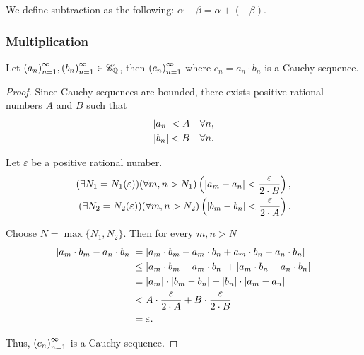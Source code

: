 We define subtraction as the following: $\alpha - \beta = \alpha + (-\beta)$.

\subsubsection*{Multiplication}

\begin{theorem}\label{theorem:chapter1:product-of-cauchy-sequences}
    Let ${\left({a_{n}}\right)}^{\infty}_{n=1}, {\left({b_{n}}\right)}^{\infty}_{n=1}\in\mathscr{C}_{\mathbb{Q}}$, then ${\left({c_{n}}\right)}^{\infty}_{n=1}$ where $c_{n} = a_{n} \cdot b_{n}$ is a Cauchy sequence.
\end{theorem}

\begin{proof}
    Since Cauchy sequences are bounded, there exists positive rational numbers $A$ and $B$ such that
    \[
        \begin{split}
            \left\vert{a_{n}}\right\vert < A\quad\forall n, \\
            \left\vert{b_{n}}\right\vert < B\quad\forall n.
        \end{split}
    \]

    Let $\varepsilon$ be a positive rational number.
    \[
        \begin{split}
            (\exists N_{1}=N_{1}(\varepsilon))(\forall m, n > N_{1})\left(\left\vert{a_{m} - a_{n}}\right\vert < \frac{\varepsilon}{2\cdot B}\right), \\
            (\exists N_{2}=N_{2}(\varepsilon))(\forall m, n > N_{2})\left(\left\vert{b_{m} - b_{n}}\right\vert < \frac{\varepsilon}{2\cdot A}\right).
        \end{split}
    \]

    Choose $N = \max\{ N_{1}, N_{2} \}$. Then for every $m, n > N$
    \begin{align*}
        \left\vert{a_{m}\cdot b_{m} - a_{n}\cdot b_{n}}\right\vert & = \left\vert{a_{m}\cdot b_{m} - a_{m}\cdot b_{n} + a_{m}\cdot b_{n} - a_{n}\cdot b_{n}}\right\vert         \\
                                                  & \le \left\vert{a_{m}\cdot b_{m} - a_{m}\cdot b_{n}}\right\vert + \left\vert{a_{m}\cdot b_{n} - a_{n}\cdot b_{n}}\right\vert \\
                                                  & = \left\vert{a_{m}}\right\vert\cdot\left\vert{b_{m} - b_{n}}\right\vert + \left\vert{b_{n}}\right\vert\cdot\left\vert{a_{m} - a_{n}}\right\vert               \\
                                                  & < A\cdot\frac{\varepsilon}{2\cdot A} + B\cdot\frac{\varepsilon}{2\cdot B}                 \\
                                                  & = \varepsilon.
    \end{align*}

    Thus, ${\left({c_{n}}\right)}^{\infty}_{n=1}$ is a Cauchy sequence.
\end{proof}

